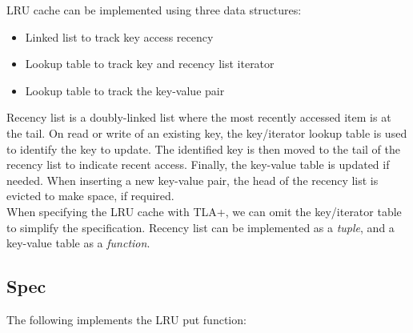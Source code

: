 LRU cache can be implemented using three data structures: 
\begin{itemize}
    \item Linked list to track key access recency 
    \item Lookup table to track key and recency list iterator 
    \item Lookup table to track the key-value pair
\end{itemize}

Recency list is a doubly-linked list where the most recently accessed item is at
the tail. On read or write of an existing key, the key/iterator lookup table is
used to identify the key to update. The identified key is then moved to the tail
of the recency list to indicate recent access. Finally, the key-value table is
updated if needed. When inserting a new key-value pair, the head of the recency list
is evicted to make space, if required.\\

When specifying the LRU cache with TLA+, we can omit the key/iterator table to
simplify the specification. Recency list can be implemented as a \textit{tuple},
and a key-value table as a \textit{function}.\\

\subsection{Spec}

The following implements the LRU put function:\\

